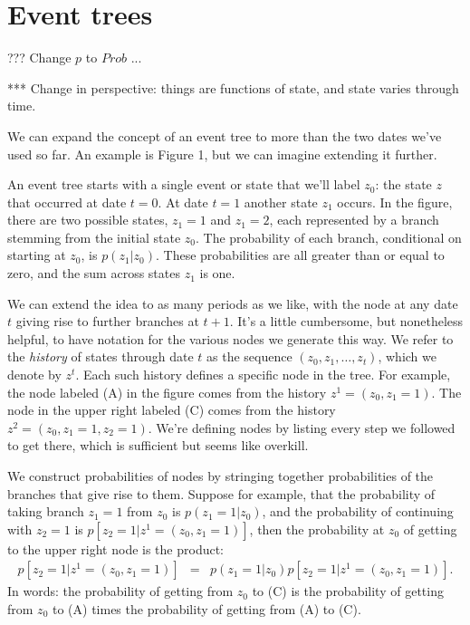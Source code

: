 \documentclass[11pt]{article}
\begin{document}
\section{Event trees}

??? Change $p$ to $Prob$ ...

*** Change in perspective:  things are functions of state, and state varies through time.  

We can expand the concept of an event tree to more than the two
dates we've used so far.
An example is Figure 1, but we can imagine extending it further.

An event tree starts with a single event or state that we'll label $z_0$:
the state $z$ that occurred at date $t=0$.
At date $t=1$ another state $z_1$ occurs.
In the figure, there are two possible states, $z_1 = 1$ and $z_1 = 2$,
each represented by a branch stemming from the initial state $z_0$.
The probability of each branch, conditional on starting at $z_0$,
is $p(z_1| z_0)$. These probabilities are all greater than or equal to zero,
and the sum across states $z_1$ is one.

We can extend the idea to as many periods as we like,
with the node at any date $t$ giving rise to further branches at $t+1$.
It's a little cumbersome, but nonetheless helpful,
to have notation for the various nodes we generate this way.
We refer to the {\it history\/} of states through date $t$
as the sequence $(z_0, z_1, \ldots, z_t)$, which we denote by $z^t$.
Each such history defines a specific node in the tree.
For example, the node labeled (A) in the figure comes from the history
$z^1 = (z_0, z_1 = 1)$.
The node in the upper right labeled (C)
comes from the history $z^2 = (z_0, z_1 = 1, z_2 = 1)$.
We're defining nodes by listing every step we followed to get there,
which is sufficient but seems like overkill.

We construct probabilities of nodes by stringing together probabilities
of the branches that give rise to them.
Suppose for example, that the probability of
taking branch $z_1=1$ from $z_0$ is $p(z_1=1| z_0)$,
and the probability of continuing with $z_2 = 1$ is $p[z_2=1 | z^1 = (z_0, z_1=1) ]$,
then the probability at $z_0$ of getting to the upper right node is the product:
\begin{eqnarray*}
    p[z_2=1 | z^1 = (z_0, z_1=1) ] &=& p(z_1=1| z_0) p[z_2=1 | z^1 = (z_0, z_1=1) ] .
\end{eqnarray*}
In words:  the probability of getting from $z_0$ to (C)
is the probability of getting from $z_0$ to (A)
times the probability of getting from (A) to (C).
\end{document}

